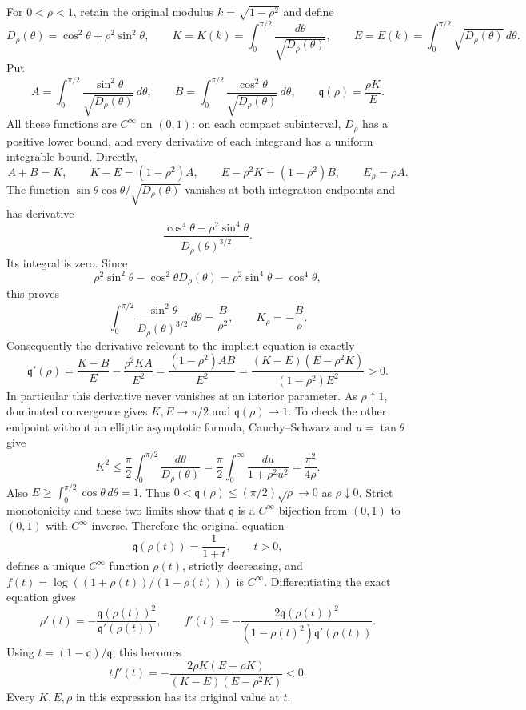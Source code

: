 \documentclass[11pt,a4paper]{article}
\begin{document}
For $0<\rho<1$, retain the original modulus
$k=\sqrt{1-\rho^2}$ and define
\[
 D_\rho(\theta)=\cos^2\theta+\rho^2\sin^2\theta,
 \qquad
 K=K(k)=\int_0^{\pi/2}\frac{d\theta}{\sqrt{D_\rho(\theta)}},
 \qquad
 E=E(k)=\int_0^{\pi/2}\sqrt{D_\rho(\theta)}\,d\theta.
\]
Put
\[
 A=\int_0^{\pi/2}\frac{\sin^2\theta}{\sqrt{D_\rho(\theta)}}\,d\theta,
 \qquad
 B=\int_0^{\pi/2}\frac{\cos^2\theta}{\sqrt{D_\rho(\theta)}}\,d\theta,
 \qquad \mathfrak q(\rho)=\frac{\rho K}{E}.
\]
All these functions are $C^\infty$ on $(0,1)$: on each compact
subinterval, $D_\rho$ has a positive lower bound, and every derivative
of each integrand has a uniform integrable bound. Directly,
\[
 A+B=K,\qquad K-E=(1-\rho^2)A,
 \qquad E-\rho^2K=(1-\rho^2)B,
 \qquad E_\rho=\rho A.
\]
The function $\sin\theta\cos\theta/\sqrt{D_\rho(\theta)}$
vanishes at both integration endpoints and has derivative
\[
 \frac{\cos^4\theta-\rho^2\sin^4\theta}
 {D_\rho(\theta)^{3/2}}.
\]
Its integral is zero. Since
\[
 \rho^2\sin^2\theta-\cos^2\theta D_\rho(\theta)
 =\rho^2\sin^4\theta-\cos^4\theta,
\]
this proves
\[
 \int_0^{\pi/2}\frac{\sin^2\theta}{D_\rho(\theta)^{3/2}}\,d\theta
 =\frac B{\rho^2},\qquad K_\rho=-\frac B\rho.
\]
Consequently the derivative relevant to the implicit equation is exactly
\[
 \boxed{
 \mathfrak q'(\rho)=\frac{K-B}{E}-\frac{\rho^2KA}{E^2}
 =\frac{(1-\rho^2)AB}{E^2}
 =\frac{(K-E)(E-\rho^2K)}{(1-\rho^2)E^2}>0.}
\]
In particular this derivative never vanishes at an interior parameter.
As $\rho\uparrow1$, dominated convergence gives $K,E\to\pi/2$
and $\mathfrak q(\rho)\to1$. To check the other endpoint without an elliptic
asymptotic formula, Cauchy--Schwarz and $u=\tan\theta$ give
\[
 K^2\le\frac\pi2\int_0^{\pi/2}\frac{d\theta}{D_\rho(\theta)}
 =\frac\pi2\int_0^\infty\frac{du}{1+\rho^2u^2}
 =\frac{\pi^2}{4\rho}.
\]
Also $E\ge\int_0^{\pi/2}\cos\theta\,d\theta=1$.
Thus $0<\mathfrak q(\rho)\le(\pi/2)\sqrt\rho\to0$ as $\rho\downarrow0$.
Strict monotonicity and these two limits show that $\mathfrak q$ is a
$C^\infty$ bijection from $(0,1)$ to $(0,1)$ with $C^\infty$ inverse.
Therefore the original equation
\[
 \mathfrak q(\rho(t))=\frac1{1+t},\qquad t>0,
\]
defines a unique $C^\infty$ function $\rho(t)$, strictly decreasing,
and $f(t)=\log((1+\rho(t))/(1-\rho(t)))$ is $C^\infty$.
Differentiating the exact equation gives
\[
 \rho'(t)=-\frac{\mathfrak q(\rho(t))^2}{\mathfrak q'(\rho(t))},\qquad
 f'(t)=-\frac{2\mathfrak q(\rho(t))^2}{(1-\rho(t)^2)\mathfrak q'(\rho(t))}.
\]
Using $t=(1-\mathfrak q)/\mathfrak q$, this becomes
\[
 \boxed{
 t f'(t)=-\frac{2\rho K(E-\rho K)}{(K-E)(E-\rho^2K)}<0.}
\]
Every $K,E,\rho$ in this expression has its original value at $t$.
\end{document}
